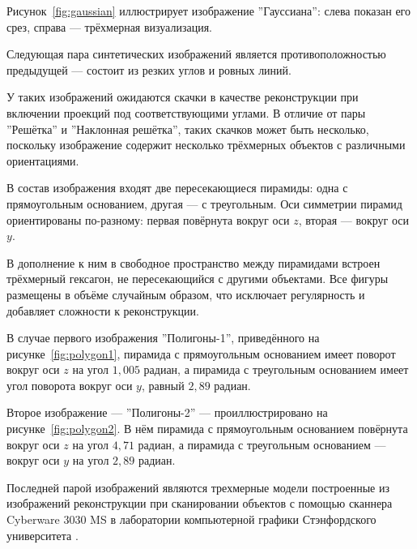 Рисунок~\ref{fig:gaussian} иллюстрирует изображение ''Гауссиана'': слева показан его срез, справа — трёхмерная визуализация.


Следующая пара синтетических изображений является противоположностью предыдущей — состоит из резких углов и ровных линий.

У таких изображений ожидаются скачки в качестве реконструкции при включении проекций под соответствующими углами. В отличие от пары ''Решётка'' и ''Наклонная решётка'', таких скачков может быть несколько, поскольку изображение содержит несколько трёхмерных объектов с различными ориентациями.

В состав изображения входят две пересекающиеся пирамиды: одна с прямоугольным основанием, другая — с треугольным. Оси симметрии пирамид ориентированы по-разному: первая повёрнута вокруг оси \(z\), вторая — вокруг оси \(y\). 

В дополнение к ним в свободное пространство между пирамидами встроен трёхмерный гексагон, не пересекающийся с другими объектами. Все фигуры размещены в объёме случайным образом, что исключает регулярность и добавляет сложности к реконструкции.

В случае первого изображения ''Полигоны-1'', приведённого на рисунке~\ref{fig:polygon1}, пирамида с прямоугольным основанием имеет поворот вокруг оси \(z\) на угол \(1{,}005\) радиан, а пирамида с треугольным основанием имеет угол поворота вокруг оси \(y\), равный \(2{,}89\) радиан.


Второе изображение — ''Полигоны-2'' — проиллюстрировано на рисунке~\ref{fig:polygon2}. В нём пирамида с прямоугольным основанием повёрнута вокруг оси \(z\) на угол \(4{,}71\) радиан, а пирамида с треугольным основанием — вокруг оси \(y\) на угол \(2{,}89\) радиан.


Последней парой изображений являются трехмерные модели построенные из изображений реконструкции при сканировании  объектов с помощью сканнера  Cyberware 3030 MS в лаборатории компьютерной графики Стэнфордского университета \cite{stanfordRepository}.

